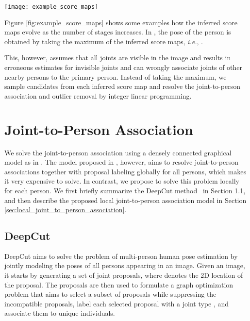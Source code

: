 \documentclass[runningheads]{llncs}
\newcommand{\ie}{\mbox{\emph{i.e.}}}
\begin{document}
\begin{figure*}[t!]
\centering
\captionsetup[figure]{skip=0pt}
\texttt{[image: example\_score\_maps]}
\caption{Examples of score maps provided by different stages of the CPM. The first stage of CPM uses only local image evidence and therefore provides high confidence scores for the joints of all persons in the image. Whereas all subsequent stages are trained to provide high confidence scores only for the joints of the primary person while suppressing the joints of other persons. The primary person is highlighted by a yellow dot in the first row. (best viewed in color)}
\label{fig:example_score_maps}
\end{figure*}


Figure \ref{fig:example_score_maps} shows some examples how the inferred score maps evolve as the number of stages increases. In \cite{wei2016convolutional}, the pose of the person is obtained by taking the maximum of the inferred score maps, \ie, .

This, however, assumes that all joints are visible in the image and results in erroneous estimates for invisible joints and can wrongly associate joints of other nearby persons to the primary person. Instead of taking the maximum, we sample  candidates from each inferred score map  and resolve the joint-to-person association and outlier removal by integer linear programming.   

\section{Joint-to-Person Association}\label{sec:jtop}
We solve the joint-to-person association using a densely connected graphical model as in \cite{pishchulin2015deepcut}. The model proposed in \cite{pishchulin2015deepcut}, however, aims to resolve joint-to-person associations together with proposal labeling globally for all persons, which makes it very expensive to solve. In contrast, we propose to solve this problem locally for each person. We first briefly summarize the DeepCut method~\cite{pishchulin2015deepcut} in Section \ref{sec:deepcut}, and then describe the proposed local joint-to-person association model in Section \ref{sec:local_joint_to_person_association}. 

\subsection{DeepCut}
\label{sec:deepcut}
DeepCut aims to solve the problem of multi-person human pose estimation by jointly modeling the poses of all persons appearing in an image. Given an image, it starts by generating a set  of joint proposals, where  denotes the 2D location of the  proposal. The proposals are then used to formulate a graph optimization problem that aims to select a subset of proposals while suppressing the incompatible proposals, label each selected proposal with a joint type , and associate them to unique individuals. 
\end{document}
